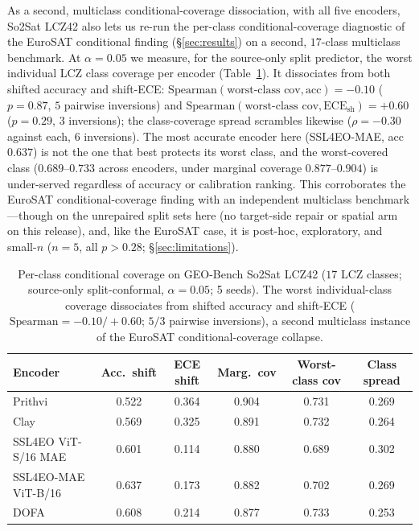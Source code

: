 \documentclass[journal]{IEEEtran}
\renewcommand{\_}{\textunderscore\allowbreak}
\begin{document}
As a second, multiclass conditional-coverage dissociation, with all five encoders, So2Sat LCZ42
also lets us re-run the per-class conditional-coverage diagnostic of the EuroSAT conditional finding
(\S\ref{sec:results}) on a second, $17$-class multiclass benchmark. At $\alpha{=}0.05$ we measure, for the
source-only split predictor, the worst individual LCZ class coverage per encoder (Table~\ref{tab:so2satcond}).
It dissociates from both shifted accuracy and shift-ECE:
$\mathrm{Spearman}(\text{worst-class cov},\text{acc})=-0.10$ ($p{=}0.87$, $5$ pairwise inversions) and
$\mathrm{Spearman}(\text{worst-class cov},\text{ECE}_{\mathrm{sh}})=+0.60$ ($p{=}0.29$, $3$ inversions);
the class-coverage spread scrambles likewise ($\rho=-0.30$ against each, $6$ inversions). The most accurate
encoder here (SSL4EO-MAE, acc $0.637$) is not the one that best protects its worst class, and the
worst-covered class ($0.689$--$0.733$ across encoders, under marginal coverage $0.877$--$0.904$) is
under-served regardless of accuracy or calibration ranking. This corroborates the EuroSAT
conditional-coverage finding with an independent multiclass benchmark---though on the unrepaired
split sets here (no target-side repair or spatial arm on this release), and, like the EuroSAT case, it is
post-hoc, exploratory, and small-$n$ ($n{=}5$, all $p>0.28$; \S\ref{sec:limitations}).

\begin{table}[htbp]\centering\small
\caption{Per-class conditional coverage on GEO-Bench So2Sat LCZ42 ($17$ LCZ classes; source-only
split-conformal, $\alpha{=}0.05$; 5 seeds). The worst individual-class coverage dissociates from shifted
accuracy and shift-ECE ($\mathrm{Spearman}=-0.10/+0.60$; $5/3$ pairwise inversions), a second
multiclass instance of the EuroSAT conditional-coverage collapse.}\label{tab:so2satcond}
\begin{tabular}{lccccc}
\toprule
Encoder & Acc.\ shift & ECE shift & Marg.\ cov & Worst-class cov & Class spread \\
\midrule
Prithvi             & 0.522 & 0.364 & 0.904 & 0.731 & 0.269 \\
Clay                & 0.569 & 0.325 & 0.891 & 0.732 & 0.264 \\
SSL4EO ViT-S/16 MAE & 0.601 & 0.114 & 0.880 & 0.689 & 0.302 \\
SSL4EO-MAE ViT-B/16 & 0.637 & 0.173 & 0.882 & 0.702 & 0.269 \\
DOFA                & 0.608 & 0.214 & 0.877 & 0.733 & 0.253 \\
\bottomrule
\end{tabular}
\end{table}
\end{document}
